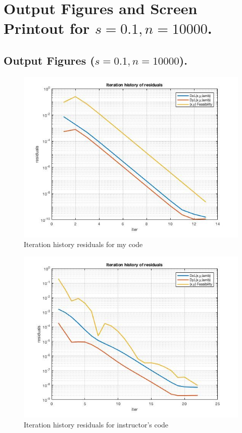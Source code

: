 \clearpage
\section{Output Figures and Screen Printout for $s=0.1,n=10000$.}
\subsection{Output Figures ($s=0.1,n=10000$).}
\begin{figure}[H]
\centering
\includegraphics[width=12cm]{F_4/F_1_2.jpg}
\caption{Iteration history residuals for my code}
\end{figure}
\begin{figure}[H]
\centering
\includegraphics[width=12cm]{F_4/F_1_3.jpg}
\caption{Iteration history residuals for instructor's code}
\end{figure}

